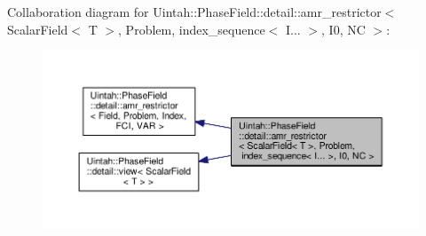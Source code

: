 Collaboration diagram for Uintah\+:\+:Phase\+Field\+:\+:detail\+:\+:amr\+\_\+restrictor$<$ Scalar\+Field$<$ T $>$, Problem, index\+\_\+sequence$<$ I... $>$, I0, NC $>$\+:\nopagebreak
\begin{figure}[H]
\begin{center}
\leavevmode
\includegraphics[width=350pt]{classUintah_1_1PhaseField_1_1detail_1_1amr__restrictor_3_01ScalarField_3_01T_01_4_00_01Problem_01f60fd6bddea2818dfc4c8616cecbd87}
\end{center}
\end{figure}

